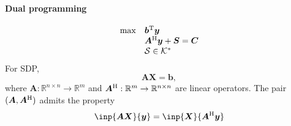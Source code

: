 \paragraph{Dual programming}
\begin{equation}
\begin{array}{ll}
\max&\bm b^{\mathrm T}\bm y\\
&\bm A^{\mathrm H}\bm y+\bm S=\bm C\\
&\mathcal{S}\in\mathcal{K}^*
\end{array}
\end{equation}
For SDP, 
\[
\bm{AX}=\bm b,
\]
where $\bm A:\mathbb{R}^{n\times n}\to\mathbb{R}^m$ and $\bm A^{\mathrm H}:\mathbb{R}^m\to\mathbb{R}^{n\times n}$ are linear operators. The pair $(\bm A,\bm A^{\mathrm H})$ admits the property
\[
\inp{\bm{AX}}{\bm y}=\inp{\bm X}{\bm A\Her\bm y}
\]

